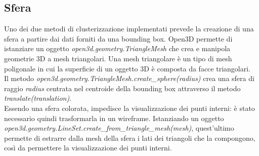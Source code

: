 \documentclass[italian]{report}
\begin{document}
\subsection{Sfera}
Uno dei due metodi di clusterizzazione implementati prevede la creazione di una sfera a partire dai dati forniti da una bounding box. Open3D permette di istanziare un oggetto \textit{open3d.geometry.TriangleMesh} che crea e manipola geometrie 3D a mesh triangolari. Una mesh triangolare è un tipo di mesh poligonale in cui la superficie di un oggetto 3D è composta da facce triangolari.\\
Il metodo \textit{open3d.geometry.TriangleMesh.create\_sphere(radius)} crea una sfera di raggio \textit{radius} centrata nel centroide della bounding box attraverso il metodo \textit{translate(translation)}.\\
Essendo una sfera colorata, impedisce la visualizzazione dei punti interni: è stato necessario quindi trasformarla in un wireframe. Istanziando un oggetto\\ \textit{open3d.geometry.LineSet.create\_from\_triangle\_mesh(mesh)}, quest'ultimo permette di estrarre dalla mesh della sfera i lati dei triangoli che la compongono, così da permettere la visualizzazione dei punti interni.\\
\end{document}

